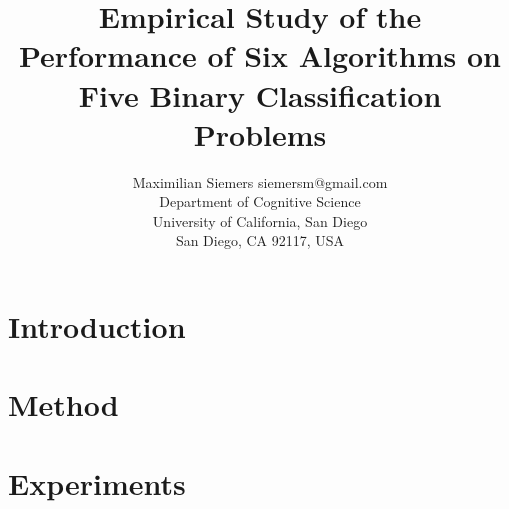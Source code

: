 \documentclass[twoside,11pt]{article}
\begin{document}
	
	\title{Empirical Study of the Performance of Six Algorithms on Five Binary Classification Problems}
	
	\author{\name Maximilian Siemers \email siemersm@gmail.com \\
		\addr Department of Cognitive Science\\
		University of California, San Diego\\
		San Diego, CA 92117, USA}
	
	
	\maketitle
	
	\begin{abstract}%
		
	\end{abstract}
	
	\begin{keywords}
		
	\end{keywords}

	
	\section{Introduction}
	
	\section{Method}
	
	\section{Experiments}
		
\end{document}
